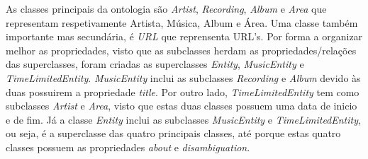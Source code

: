 \documentclass{article}
\begin{document}
As classes principais da ontologia são \textit{Artist}, \textit{Recording}, \textit{Album} e \textit{Area} que representam respetivamente Artista, Música, Album e Área. Uma classe também importante mas secundária, é \textit{URL} que reprensenta URL's. Por forma a organizar melhor as propriedades, visto que as subclasses herdam as propriedades/relações das superclasses, foram criadas as superclasses \textit{Entity}, \textit{MusicEntity} e \textit{TimeLimitedEntity}. \textit{MusicEntity} inclui as subclasses \textit{Recording} e \textit{Album} devido às duas possuirem a propriedade \textit{title}. Por outro lado, \textit{TimeLimitedEntity} tem como subclasses \textit{Artist} e \textit{Area}, visto que estas duas classes possuem uma data de inicio e de fim. Já a classe \textit{Entity} inclui as subclasses \textit{MusicEntity} e \textit{TimeLimitedEntity}, ou seja, é a superclasse das quatro principais classes, até porque estas quatro classes possuem as propriedades \textit{about} e \textit{disambiguation}.
\end{document}
